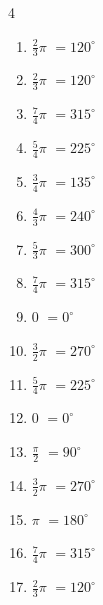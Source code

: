 \begin{multicols}{4}
\begin{enumerate}
  \item $\displaystyle \frac{2}{3}\pi$
        $\displaystyle =120^{\circ}$

  \item $\displaystyle \frac{2}{3}\pi$
        $\displaystyle =120^{\circ}$

  \item $\displaystyle \frac{7}{4}\pi$
        $\displaystyle =315^{\circ}$

  \item $\displaystyle \frac{5}{4}\pi$
        $\displaystyle =225^{\circ}$

  \item $\displaystyle \frac{3}{4}\pi$
        $\displaystyle =135^{\circ}$

  \item $\displaystyle \frac{4}{3}\pi$
        $\displaystyle =240^{\circ}$

  \item $\displaystyle \frac{5}{3}\pi$
        $\displaystyle =300^{\circ}$

  \item $\displaystyle \frac{7}{4}\pi$
        $\displaystyle =315^{\circ}$

  \item $\displaystyle 0$
        $\displaystyle =0^{\circ}$

  \item $\displaystyle \frac{3}{2}\pi$
        $\displaystyle =270^{\circ}$

  \item $\displaystyle \frac{5}{4}\pi$
        $\displaystyle =225^{\circ}$

  \item $\displaystyle 0$
        $\displaystyle =0^{\circ}$

  \item $\displaystyle \frac{\pi}{2}$
        $\displaystyle =90^{\circ}$

  \item $\displaystyle \frac{3}{2}\pi$
        $\displaystyle =270^{\circ}$

  \item $\displaystyle \pi$
        $\displaystyle =180^{\circ}$

  \item $\displaystyle \frac{7}{4}\pi$
        $\displaystyle =315^{\circ}$

  \item $\displaystyle \frac{2}{3}\pi$
        $\displaystyle =120^{\circ}$


\end{enumerate}
\end{multicols}

